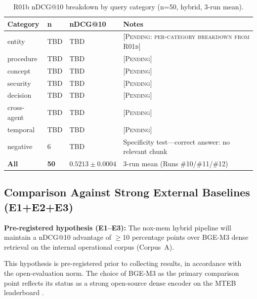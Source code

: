 \documentclass{article}
\begin{document}
\begin{table}[t]
  \caption{R01b nDCG@10 breakdown by query category (n=50, hybrid, 3-run mean).}
  \label{tab:category}
  \centering
  \begin{tabular}{llll}
    \toprule
    Category & n & nDCG@10 & Notes \\
    \midrule
    entity      & TBD & TBD & \textsc{[Pending: per-category breakdown from R01b]} \\
    procedure   & TBD & TBD & \textsc{[Pending]} \\
    concept     & TBD & TBD & \textsc{[Pending]} \\
    security    & TBD & TBD & \textsc{[Pending]} \\
    decision    & TBD & TBD & \textsc{[Pending]} \\
    cross-agent & TBD & TBD & \textsc{[Pending]} \\
    temporal    & TBD & TBD & \textsc{[Pending]} \\
    negative    & 6   & TBD & Specificity test---correct answer: no relevant chunk \\
    \textbf{All} & \textbf{50} & $\mathbf{0.5213 \pm 0.0004}$ & 3-run mean (Runs \#10/\#11/\#12) \\
    \bottomrule
  \end{tabular}
\end{table}

\subsection{Comparison Against Strong External Baselines (E1+E2+E3)}

\textbf{Pre-registered hypothesis (E1--E3):} The nox-mem hybrid pipeline will maintain a
nDCG@10 advantage of $\geq$10 percentage points over BGE-M3 dense retrieval on the
internal operational corpus (Corpus~A).

This hypothesis is pre-registered prior to collecting results, in accordance with the
open-evaluation norm. The choice of BGE-M3 as the primary comparison point reflects its
status as a strong open-source dense encoder on the MTEB leaderboard
\cite{muennighoff2022mteb}.
\end{document}
